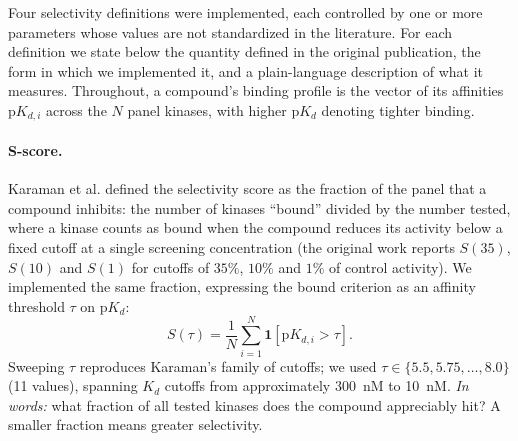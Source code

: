 \documentclass[journal=jcisd8,manuscript=article]{achemso}
\begin{document}
Four selectivity definitions were implemented, each controlled by one or more
parameters whose values are not standardized in the literature.
For each definition we state below the quantity defined in the original
publication, the form in which we implemented it, and a plain-language
description of what it measures.
Throughout, a compound's binding profile is the vector of its affinities
$\mathrm{p}K_{d,i}$ across the $N$ panel kinases, with higher
$\mathrm{p}K_{d}$ denoting tighter binding.

\paragraph{S-score.}
Karaman et al.\cite{Karaman2008} defined the selectivity score as the fraction
of the panel that a compound inhibits: the number of kinases ``bound'' divided
by the number tested, where a kinase counts as bound when the compound reduces
its activity below a fixed cutoff at a single screening concentration (the
original work reports $S(35)$, $S(10)$ and $S(1)$ for cutoffs of $35\%$, $10\%$
and $1\%$ of control activity).
We implemented the same fraction, expressing the bound criterion as an affinity
threshold $\tau$ on $\mathrm{p}K_d$:
\begin{equation}
  S(\tau) = \frac{1}{N} \sum_{i=1}^{N} \mathbf{1}[\mathrm{p}K_{d,i} > \tau].
\end{equation}
Sweeping $\tau$ reproduces Karaman's family of cutoffs; we used
$\tau \in \{5.5, 5.75, \ldots, 8.0\}$ (11 values), spanning $K_d$ cutoffs from
approximately 300~nM to 10~nM.
\emph{In words:} what fraction of all tested kinases does the compound
appreciably hit? A smaller fraction means greater selectivity.
\end{document}
